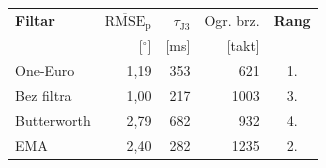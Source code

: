 \begin{tabular}{l rrr c}
\hline
\textbf{Filtar} & \small $\overline{\text{RMSE}}_\text{p}$ & \small $\tau_\text{J3}$ & \small Ogr. brz. & \textbf{Rang} \\
 & \small [$^\circ$] & \small [ms] & \small [takt] & \\
\hline
One-Euro & 1,19 & 353 & 621 & 1. \\
Bez filtra & 1,00 & 217 & 1003 & 3. \\
Butterworth & 2,79 & 682 & 932 & 4. \\
EMA & 2,40 & 282 & 1235 & 2. \\
\hline
\end{tabular}
